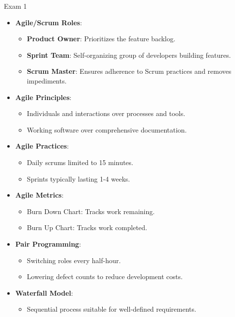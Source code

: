 \begin{examnotes}{Exam 1}
\begin{highlight}
        \begin{itemize}
            \item \textbf{Agile/Scrum Roles}:
                \begin{itemize}
                    \item \textbf{Product Owner}: Prioritizes the feature backlog.
                    \item \textbf{Sprint Team}: Self-organizing group of developers building features.
                    \item \textbf{Scrum Master}: Ensures adherence to Scrum practices and removes impediments.
                \end{itemize}
            \item \textbf{Agile Principles}:
                \begin{itemize}
                    \item Individuals and interactions over processes and tools.
                    \item Working software over comprehensive documentation.
                \end{itemize}
            \item \textbf{Agile Practices}:
                \begin{itemize}
                    \item Daily scrums limited to 15 minutes.
                    \item Sprints typically lasting 1-4 weeks.
                \end{itemize}
            \item \textbf{Agile Metrics}:
                \begin{itemize}
                    \item Burn Down Chart: Tracks work remaining.
                    \item Burn Up Chart: Tracks work completed.
                \end{itemize}
            \item \textbf{Pair Programming}:
                \begin{itemize}
                    \item Switching roles every half-hour.
                    \item Lowering defect counts to reduce development costs.
                \end{itemize}
            \item \textbf{Waterfall Model}:
                \begin{itemize}
                    \item Sequential process suitable for well-defined requirements.
                \end{itemize}
        \end{itemize}
    \end{highlight}
    

\end{examnotes}
